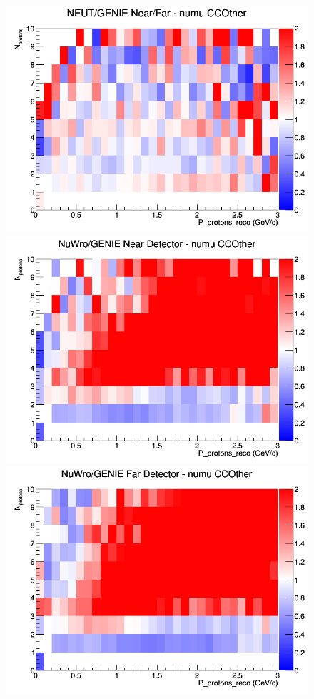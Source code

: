 \documentclass[12pt]{article}
\begin{document}
\begin{figure}[h]
\endminipage
{}
\includegraphics[width=\linewidth]{eff_N_P/LAr/protons/ratios/CCOther_NEUT_GENIE_numu_NF_N_P.png}
\endminipage
\newline
{}
\includegraphics[width=\linewidth]{eff_N_P/LAr/protons/ratios/CCOther_NuWro_GENIE_numu_near_N_P.png}
\endminipage
{}
\includegraphics[width=\linewidth]{eff_N_P/LAr/protons/ratios/CCOther_NuWro_GENIE_numu_far_N_P.png}

\end{figure}
\end{document}
